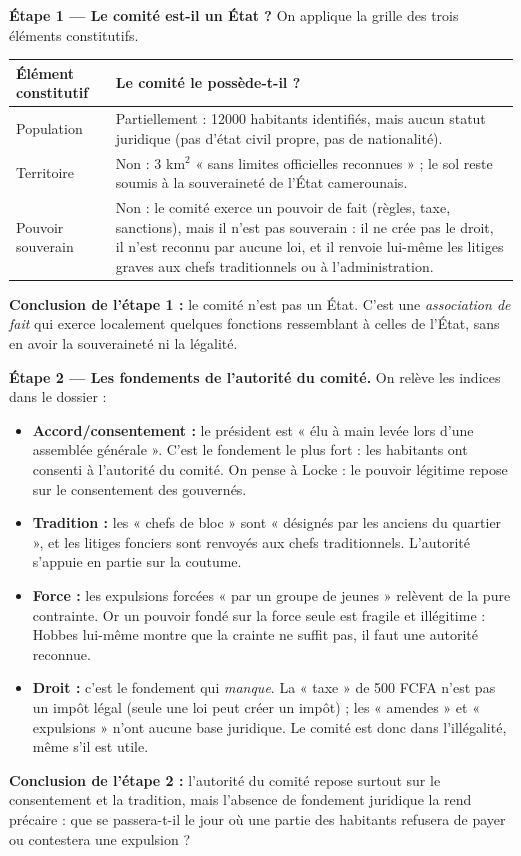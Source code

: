 \documentclass[11pt]{article}
\begin{document}
\begin{exoresolu}
\textbf{Étape 1 — Le comité est-il un État ?} On applique la grille des trois éléments constitutifs.

\begin{center}
\begin{tabularx}{\linewidth}{|l|X|}\hline
\rowcolor{popblueL} \textbf{Élément constitutif} & \textbf{Le comité le possède-t-il ?} \\ \hline
Population & Partiellement : \num{12000} habitants identifiés, mais aucun statut juridique (pas d'état civil propre, pas de nationalité). \\ \hline
Territoire & Non : 3 km$^2$ « sans limites officielles reconnues » ; le sol reste soumis à la souveraineté de l'État camerounais. \\ \hline
Pouvoir souverain & Non : le comité exerce un pouvoir de fait (règles, taxe, sanctions), mais il n'est pas souverain : il ne crée pas le droit, il n'est reconnu par aucune loi, et il renvoie lui-même les litiges graves aux chefs traditionnels ou à l'administration. \\ \hline
\end{tabularx}
\end{center}

\textbf{Conclusion de l'étape 1 :} le comité n'est pas un État. C'est une \emph{association de fait} qui exerce localement quelques fonctions ressemblant à celles de l'État, sans en avoir la souveraineté ni la légalité.

\tcblower

\textbf{Étape 2 — Les fondements de l'autorité du comité.} On relève les indices dans le dossier :
\begin{itemize}
\item \textbf{Accord/consentement :} le président est « élu à main levée lors d'une assemblée générale ». C'est le fondement le plus fort : les habitants ont consenti à l'autorité du comité. On pense à Locke : le pouvoir légitime repose sur le consentement des gouvernés.
\item \textbf{Tradition :} les « chefs de bloc » sont « désignés par les anciens du quartier », et les litiges fonciers sont renvoyés aux chefs traditionnels. L'autorité s'appuie en partie sur la coutume.
\item \textbf{Force :} les expulsions forcées « par un groupe de jeunes » relèvent de la pure contrainte. Or un pouvoir fondé sur la force seule est fragile et illégitime : Hobbes lui-même montre que la crainte ne suffit pas, il faut une autorité reconnue.
\item \textbf{Droit :} c'est le fondement qui \emph{manque}. La « taxe » de 500 FCFA n'est pas un impôt légal (seule une loi peut créer un impôt) ; les « amendes » et « expulsions » n'ont aucune base juridique. Le comité est donc dans l'illégalité, même s'il est utile.
\end{itemize}
\textbf{Conclusion de l'étape 2 :} l'autorité du comité repose surtout sur le consentement et la tradition, mais l'absence de fondement juridique la rend précaire : que se passera-t-il le jour où une partie des habitants refusera de payer ou contestera une expulsion ?


\end{exoresolu}
\end{document}
